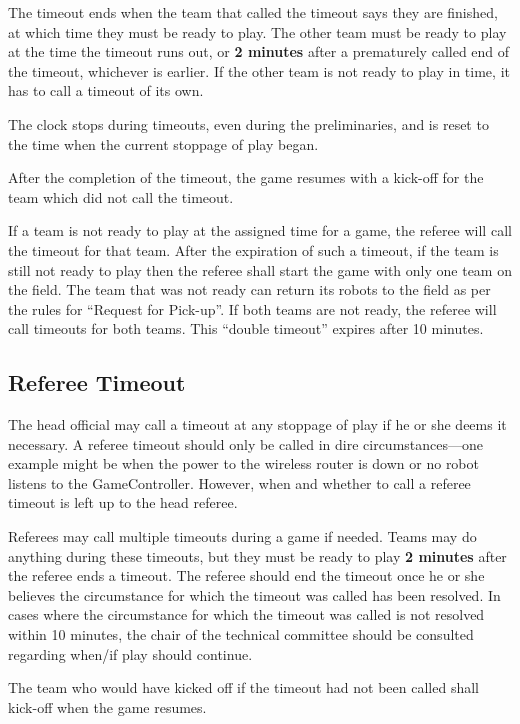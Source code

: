 The timeout ends when the team that called the timeout says they are finished, at which time they must be ready to play.
The other team must be ready to play at the time the timeout runs out, or \textbf{2 minutes} after a prematurely called end of the timeout, whichever is earlier.
If the other team is not ready to play in time, it has to call a timeout of its own.

The clock stops during timeouts, even during the preliminaries, and is reset to the time when the current stoppage of play began.

After the completion of the timeout, the game resumes with a kick-off for the team which did not call the timeout.

If a team is not ready to play at the assigned time for a game, the referee will call the timeout for that team.
After the expiration of such a timeout, if the team is still not ready to play then the referee shall start the game with only one team on the field.
The team that was not ready can return its robots to the field as per the rules for ``Request for Pick-up''.
If both teams are not ready, the referee will call timeouts for both teams.
This ``double timeout'' expires after 10 minutes.

\subsection{Referee Timeout}
\label{sec:referee_timeout}

The head official may call a timeout at any stoppage of play if he or she deems it necessary.
A referee timeout should only be called in dire circumstances---one example might be when the power to the wireless router is down or no robot listens to the GameController.
However, when and whether to call a referee timeout is left up to the head referee.

Referees may call multiple timeouts during a game if needed.
Teams may do anything during these timeouts, but they must be ready to play \textbf{2 minutes} after the referee ends a timeout.
The referee should end the timeout once he or she believes the circumstance for which the timeout was called has been resolved.
In cases where the circumstance for which the timeout was called is not resolved within 10 minutes, the chair of the technical committee should be consulted regarding when/if play should continue.

The team who would have kicked off if the timeout had not been called shall kick-off when the game resumes.

